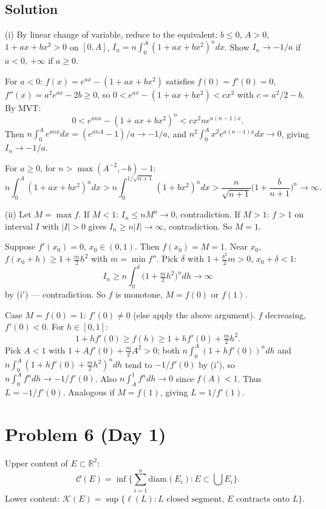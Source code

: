 \documentclass{article}
\begin{document}
\subsection*{Solution}
(i) By linear change of variable, reduce to the equivalent: $b\leq 0$, $A>0$, $1+ax+bx^2 > 0$ on $[0,A]$, $I_n = n\int_0^A (1+ax+bx^2)^n dx$. Show $I_n \to -1/a$ if $a<0$, $+\infty$ if $a\geq 0$.

For $a < 0$: $f(x) = e^{ax} - (1+ax+bx^2)$ satisfies $f(0)=f'(0)=0$, $f''(x) = a^2 e^{ax} - 2b \geq 0$, so $0 < e^{ax} - (1+ax+bx^2) < cx^2$ with $c = a^2/2 - b$. By MVT:
\[
0 < e^{anx} - (1+ax+bx^2)^n < cx^2 n e^{a(n-1)x}.
\]
Then $n\int_0^A e^{anx}dx = (e^{anA}-1)/a \to -1/a$, and $n^2\int_0^A x^2 e^{a(n-1)x}dx \to 0$, giving $I_n \to -1/a$.

For $a\geq 0$, for $n > \max(A^{-2}, -b) - 1$:
\[
n\int_0^A (1+ax+bx^2)^n dx > n\int_0^{1/\sqrt{n+1}} (1+bx^2)^n dx > \frac{n}{\sqrt{n+1}}\Big(1 + \frac{b}{n+1}\Big)^n \to \infty.
\]

(ii) Let $M = \max f$. If $M < 1$: $I_n \leq nM^n \to 0$, contradiction. If $M > 1$: $f > 1$ on interval $I$ with $|I|>0$ gives $I_n \geq n|I| \to \infty$, contradiction. So $M = 1$.

Suppose $f'(x_0)=0$, $x_0 \in (0,1)$. Then $f(x_0) = M = 1$. Near $x_0$, $f(x_0+h) \geq 1 + \tfrac{m}{2}h^2$ with $m = \min f''$. Pick $\delta$ with $1 + \tfrac{\delta^2}{2}m > 0$, $x_0 + \delta < 1$:
\[
I_n \geq n\int_0^\delta \Big(1+\tfrac{m}{2}h^2\Big)^n dh \to \infty
\]
by (i$'$) — contradiction. So $f$ is monotone, $M = f(0)$ or $f(1)$.

Case $M = f(0) = 1$: $f'(0) \neq 0$ (else apply the above argument). $f$ decreasing, $f'(0) < 0$. For $h \in [0,1]$:
\[
1 + hf'(0) \geq f(h) \geq 1 + hf'(0) + \tfrac{m}{2}h^2.
\]
Pick $A < 1$ with $1 + Af'(0) + \tfrac{m}{2}A^2 > 0$; both $n\int_0^A (1+hf'(0))^n dh$ and $n\int_0^A (1 + hf'(0) + \tfrac{m}{2}h^2)^n dh$ tend to $-1/f'(0)$ by (i$'$), so $n\int_0^A f^n dh \to -1/f'(0)$. Also $n\int_A^1 f^n dh \to 0$ since $f(A) < 1$. Thus $L = -1/f'(0)$. Analogous if $M = f(1)$, giving $L = 1/f'(1)$.

\section*{Problem 6 (Day 1)}
Upper content of $E \subset \mathbb{R}^2$:
\[
\mathcal{C}(E) = \inf\Big\{\sum_{i=1}^n \mathrm{diam}(E_i) : E \subset \bigcup E_i\Big\}.
\]
Lower content: $\mathcal{K}(E) = \sup\{\ell(L) : L \text{ closed segment, } E \text{ contracts onto } L\}$.
\end{document}
